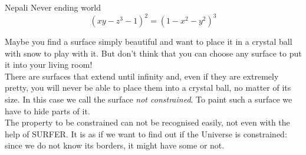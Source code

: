 \begin{surferPage}{Nepali}
Never ending world \\

\smallskip
\[(x y - z^3 -1)^2= (1 - x^2	- y^2)^3\]

\singlespacing
Maybe you find a surface simply beautiful and want to place it in a crystal ball with snow to play with it. But don't think that you can choose any surface to put it into your living room!
\\
\singlespacing
There are surfaces that extend until infinity and, even if they are extremely pretty, you will never be able to place them into a crystal ball, no matter of its size. In this case we call the surface \textit{not constrained}. To paint such a surface we have to hide parts of it.
\\
\singlespacing
The property to be constrained can not be recognised easily, not even with the help of SURFER. It is as if we want to find out if the Universe is constrained: since we do not know its borders, it might have some or not.
\end{surferPage}
